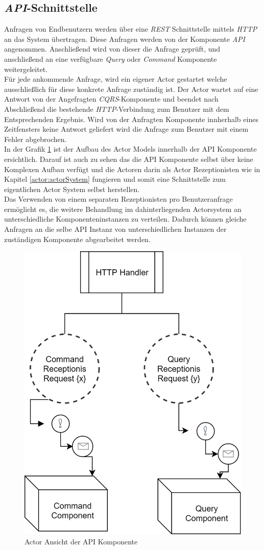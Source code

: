 \subsection{\textit{API}-Schnittstelle}
Anfragen von Endbenutzern werden über eine \textit{REST} Schnittstelle mittels \textit{HTTP} an das System übertragen. Diese Anfragen werden von der Komponente \textit{API} angenommen. Anschließend wird von dieser die Anfrage geprüft, und anschließend an eine verfügbare \textit{Query} oder \textit{Command} Komponente weitergeleitet. \\
Für jede ankommende Anfrage, wird ein eigener Actor gestartet welche ausschließlich für diese konkrete Anfrage zuständig ist. Der Actor wartet auf eine Antwort von der Angefragten \textit{CQRS}-Komponente und beendet nach Abschließend die bestehende \textit{HTTP}-Verbindung zum Benutzer mit dem Entsprechenden Ergebnis. Wird von der Anfragten Komponente innherhalb eines Zeitfensters keine Antwort geliefert wird die Anfrage zum Benutzer mit einem Fehler abgebrochen. \\
In der Grafik \ref{fig:implementation:apiActorModel} ist der Aufbau des Actor Models innerhalb der API Komponente ersichtlich. Darauf ist auch zu sehen das die API Komponente selbst über keine Komplexen Aufbau verfügt und die Actoren darin als Actor Rezeptionisten wie in Kapitel \ref{actor:actorSystem} fungieren und somit eine Schnittstelle zum eigentlichen Actor System selbst herstellen. \\
Das Verwenden von einem separaten Rezeptionisten pro Benutzeranfrage ermöglicht es, die weitere Behandlung im dahinterliegenden Actorsystem an unterschiedliche Komponenteninstanzen zu verteilen. Dadurch können gleiche Anfragen an die selbe API Instanz von unterschiedlichen Instanzen der zuständigen Komponente abgearbeitet werden. 
\begin{figure}
    \centering
    \includegraphics[width=0.5\linewidth]{gfx/implementation/apiActorModel}
    \caption{Actor Ansicht der API Komponente}
    \label{fig:implementation:apiActorModel}
\end{figure} 


